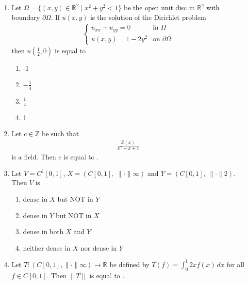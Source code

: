 \documentclass[journal]{IEEEtran}
\numberwithin{equation}{enumi}
\numberwithin{figure}{enumi}
\begin{document}
\begin{enumerate}
\item Let $\Omega = \{ (x, y) \in \mathbb{R}^2 \mid x^2 + y^2 < 1 \}$ be the open unit disc in $\mathbb{R}^2$ with boundary $\partial\Omega$. If $u(x, y)$ is the solution of the Dirichlet problem
\begin{align*}
\begin{cases}
u_{xx} + u_{yy} = 0 & \text{in } \Omega \\
u(x,y) = 1 - 2y^2 & \text{on } \partial\Omega
\end{cases}
\end{align*}
then $u\left( \frac{1}{2}, 0 \right)$ is equal to
 \hfill{}
\begin{multicols}{4}
\begin{enumerate}
    \item -1
    \item $-\frac{1}{4}$ 
    \item $\frac{1}{4} $
    \item 1
\end{enumerate}
\end{multicols}


\item Let $c \in \mathbb{Z}$ be such that 
\begin{align*}
\frac{\mathbb{Z}(x)}{x^2 + x + c}
\end{align*} is a field. Then $c$ is equal to \underline{\hspace{2cm}}.
 \hfill{}
\vspace{1em}

\item Let $V = C^1[0, 1]$, $X = (C[0, 1], \ \| \cdot \|{\infty})$ and $Y = (C[0, 1], \ \| \cdot \|{2})$. \\
Then $V$ is
 \hfill{}
\begin{enumerate}
\item  dense in $X$ but NOT in $Y$
\item dense in $Y$ but NOT in $X$
\item dense in both $X$ and $Y$
\item neither dense in $X$ nor dense in $Y$
\end{enumerate}

\item Let $T : (C[0, 1], \|\cdot\|{\infty}) \to \mathbb{R}$ be defined by $T(f) = \int_0^1 2x f(x) \, dx$ for all $f \in C[0, 1]$. Then $\|T\|$ is equal to \underline{\hspace{2cm}}.
 \hfill{}
\vspace{1em}


\end{enumerate}
\end{document}
